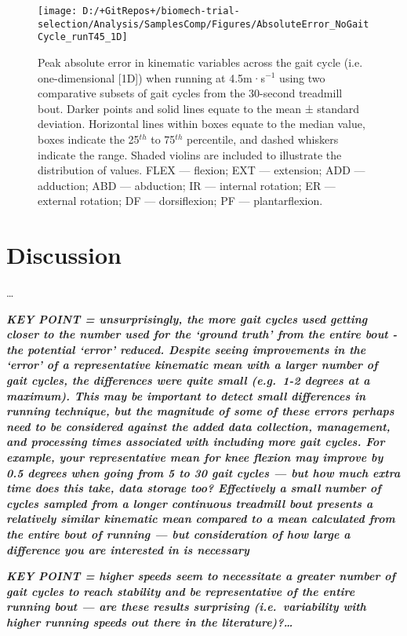 \documentclass[]{elsarticle} %
\begin{document}
\begin{figure}

{\centering \texttt{[image: D:/+GitRepos+/biomech-trial-selection/Analysis/SamplesComp/Figures/AbsoluteError\_NoGaitCycle\_runT45\_1D]} 

}

\caption{Peak absolute error in kinematic variables across the gait cycle (i.e. one-dimensional [1D]) when running at 4.5m·s$^{-1}$ using two comparative subsets of gait cycles from the 30-second treadmill bout. Darker points and solid lines equate to the mean ± standard deviation. Horizontal lines within boxes equate to the median value, boxes indicate the 25$^{th}$ to 75$^{th}$ percentile, and dashed whiskers indicate the range. Shaded violins are included to illustrate the distribution of values. FLEX — flexion; EXT — extension; ADD — adduction; ABD — abduction; IR — internal rotation; ER — external rotation; DF — dorsiflexion; PF — plantarflexion.}\label{fig:samplesComp_runT45_1D}
\end{figure}

\hypertarget{discussion}{%
\section{Discussion}\label{discussion}}

\ldots{}

\textbf{\emph{KEY POINT = unsurprisingly, the more gait cycles used
getting closer to the number used for the `ground truth' from the entire
bout - the potential `error' reduced. Despite seeing improvements in the
`error' of a representative kinematic mean with a larger number of gait
cycles, the differences were quite small (e.g.~1-2 degrees at a
maximum). This may be important to detect small differences in running
technique, but the magnitude of some of these errors perhaps need to be
considered against the added data collection, management, and processing
times associated with including more gait cycles. For example, your
representative mean for knee flexion may improve by 0.5 degrees when
going from 5 to 30 gait cycles --- but how much extra time does this
take, data storage too? Effectively a small number of cycles sampled
from a longer continuous treadmill bout presents a relatively similar
kinematic mean compared to a mean calculated from the entire bout of
running --- but consideration of how large a difference you are
interested in is necessary}}

\textbf{\emph{KEY POINT = higher speeds seem to necessitate a greater
number of gait cycles to reach stability and be representative of the
entire running bout --- are these results surprising (i.e.~variability
with higher running speeds out there in the literature)?\ldots{}}}
\end{document}
